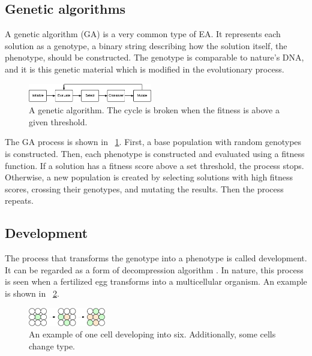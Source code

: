 
\subsection{Genetic algorithms}

A genetic algorithm (GA) is a very common type of EA.
It represents each solution as a genotype, a binary string describing how the solution itself, the phenotype, should be constructed.
The genotype is comparable to nature's DNA, and it is this genetic material which is modified in the evolutionary process.

\begin{figure}[!ht]
    \centering
    \includegraphics[width=0.48\textwidth]{figures/ga}
    \caption{A genetic algorithm. The cycle is broken when the fitness is above a given threshold.}
    \label{fig:ga}
\end{figure}

The GA process is shown in \figurename~\ref{fig:ga}.
First, a base population with random genotypes is constructed.
Then, each phenotype is constructed and evaluated using a fitness function.
If a solution has a fitness score above a set threshold, the process stops.
Otherwise, a new population is created by selecting solutions with high fitness scores, crossing their genotypes, and mutating the results.
Then the process repeats.

\subsection{Development}

The process that transforms the genotype into a phenotype is called development.
It can be regarded as a form of decompression algorithm \cite{harding2008artificial}.
In nature, this process is seen when a fertilized egg transforms into a multicellular organism.
An example is shown in \figurename~\ref{fig:development}.

\begin{figure}[!ht]
    \centering
    \includegraphics[width=0.30\textwidth]{figures/development}
    \caption{An example of one cell developing into six. Additionally, some cells change type.}
    \label{fig:development}
\end{figure}

